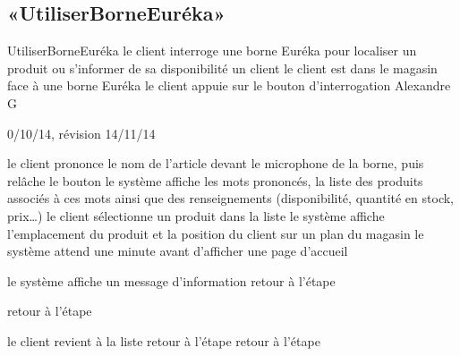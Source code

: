 \subsection{«UtiliserBorneEuréka»}

\startCU
\nom UtiliserBorneEuréka
\but le client interroge une borne Euréka pour localiser un produit ou s’informer de sa disponibilité
\acteur un client
\precondition le client est dans le magasin face à une borne Euréka
\declenchement le client appuie sur le bouton d'interrogation
\auteur Alexandre G
\date 30/10/14, révision 14/11/14

\nominal %
\startnominal
{} le client prononce le nom de l'article devant le microphone de la borne, puis relâche le bouton
 le système affiche les mots prononcés, la liste des produits associés à ces mots ainsi que des renseignements (disponibilité, quantité en stock, prix\dots) 
 le client sélectionne un produit dans la liste
\etape le système affiche l'emplacement du produit et la position du client sur un plan du magasin
 le système attend une minute avant d'afficher une page d'accueil
\stopnominal

\alternatifs 

  \etape le système affiche un message d'information
  \etape retour à l'étape 
\stopcondition
\stopalternatif

\etape retour à l'étape 
\stopcondition
\stopalternatif

  \etape le client revient à la liste 
  \etape retour à l'étape 
\stopcondition
{}
  \etape retour à l'étape 
\stopcondition
\stopalternatif

\stopCU
